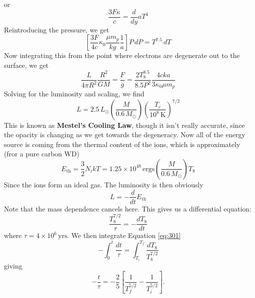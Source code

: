 \documentclass[10pt]{article}
\numberwithin{equation}{section}
\begin{document}
    or
    \begin{equation}
      \label{eq:295}
      \frac{3F\kappa}{c}=\frac{d}{dy}aT^4
    \end{equation}
    Reintroducing the pressure, we get
    \begin{equation}
      \label{eq:296}
      \left[\frac{3F}{4c}\kappa_0\frac{\mu m_p}{k g}\frac{1}{a}\right]P
\,dP=T^{7.5}\,dT
    \end{equation}
    Now integrating this from the point where electrons are degenerate
    out to the surface, we get
    \begin{equation}
      \label{eq:297}
      \frac{L}{4\pi R^2}\frac{R^2}{GM}=\frac{F}{g}=\frac{2
        T_8^{8.5}}{8.5 P^2}\frac{4c k a}{3 \kappa_0 \mu m_p}
    \end{equation}
    Solving for the luminosity and scaling, we find
    \begin{equation}
      \label{eq:298}
      \boxed{L=2.5\,L_\odot \left(\frac{M}{0.6\,M_\odot
          }\right)\left(\frac{T_c}{10^8 \,\mathrm{K}}\right)^{7/2}}
    \end{equation}
    This is known as \textbf{Mestel's Cooling Law}, though it isn't
    really accurate, since the opacity is changing as we get towards
    the degeneracy. Now all of the energy source is coming from the
    thermal content of the ions, which is approximately (fror a pure
    carbon WD)
    \begin{equation}
      \label{eq:299}
      E_{\mathrm{th}}=\frac{3}{2}N_i k T=1.25\times 10^{48}\,\mathrm{ergs}
\left(\frac{M}{0.6\,M_\odot}\right)T_8
    \end{equation}
    Since the ions form an ideal gas. The luminosity is then obviously
    \begin{equation}
      \label{eq:300}
      L=-\frac{d}{dt}E_{\mathrm{th}}
    \end{equation}
    Note that the mass dependence cancels here. This gives us a
    differential equation:
    \begin{equation}
      \label{eq:301}
      \frac{T_8^{7/2}}{\tau}=-\frac{dT_8}{dt}
    \end{equation}
    where $\tau=4\times 10^{6}\,\mathrm{yrs}$.
    We then integrate Equation \ref{eq:301}
    \begin{equation}
     -\int_0^t \dfrac{dt}{\tau} = \int_{T_i}^{T_f} \dfrac{dT_8}{T_8^{7/2}}
    \end{equation}
    giving
    \begin{equation}
     -\dfrac{t}{\tau}=-\dfrac{2}{5}\left[ \dfrac{1}{T_f^{5/2}}-\dfrac{1}{T_i^{5/2}} \right].
    \end{equation}    
\end{document}
